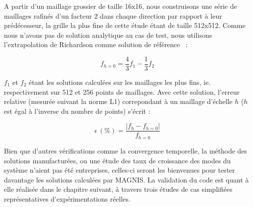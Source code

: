 \begin{refsection}
A partir d'un maillage grossier de taille 16x16, nous construisons une série de
maillages rafinés d'un facteur 2 dans chaque
direction par rapport à leur prédécesseur, la grille la
plus fine de cette étude étant de taille 512x512. Comme nous n'avons pas de
solution analytique au cas de test, nous utilisons l'extrapolation de
Richardson comme solution de référence~\parencite{Roache} :

\begin{equation}
f_{h=0}=\frac{4}{3}f_{1}-\frac{1}{3}f_2
\end{equation}

$f_{1}$ et $f_2$ étant les solutions calculées sur les maillages les plus fins,
ie. respectivement sur 512 et 256 points de maillages. Avec cette solution,
l'erreur relative (mesurée suivant la norme L1) correpondant à un maillage
d'échelle $h$ ($h$ est égal à l'inverse du nombre de points) s'écrit :

\begin{equation}
\epsilon\,(\text{\%})=\frac{|f_h-f_{h=0}|}{f_{h=0}}
\end{equation}

Bien que d'autres
vérifications comme la convergence temporelle, la méthode des solutions manufacturées, ou
une étude des taux de croissance des modes du système n'aient pas été
entreprises, celles-ci seront les bienvenues pour tester davantage les
solutions calculées par MAGNIS. La validation du code est quant à elle réalisée
dans le chapitre suivant, à travers trois études de cas simplifiées
représentatives d'expérimentations réelles.



%
%
\end{refsection}

